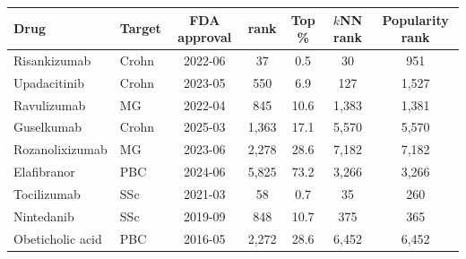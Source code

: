 \begin{tabular}{llccccc}
\toprule
Drug & Target & FDA approval & \sysname{} rank & Top \% & $k$NN rank & Popularity rank\\
\midrule
Risankizumab & Crohn & 2022-06 & 37 & 0.5 & 30 & 951\\
Upadacitinib & Crohn & 2023-05 & 550 & 6.9 & 127 & 1,527\\
Ravulizumab & MG & 2022-04 & 845 & 10.6 & 1,383 & 1,381\\
Guselkumab & Crohn & 2025-03 & 1,363 & 17.1 & 5,570 & 5,570\\
Rozanolixizumab & MG & 2023-06 & 2,278 & 28.6 & 7,182 & 7,182\\
Elafibranor & PBC & 2024-06 & 5,825 & 73.2 & 3,266 & 3,266\\
\midrule
Tocilizumab & SSc & 2021-03 & 58 & 0.7 & 35 & 260\\
Nintedanib & SSc & 2019-09 & 848 & 10.7 & 375 & 365\\
Obeticholic acid & PBC & 2016-05 & 2,272 & 28.6 & 6,452 & 6,452\\
\bottomrule
\end{tabular}